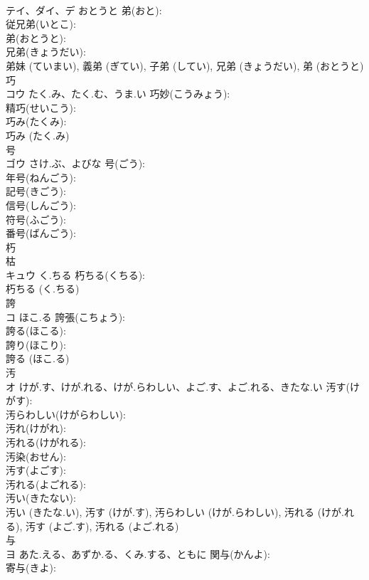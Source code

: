 \documentclass[8pt]{extreport}
\begin{document}
\begin{CJK}{UTF8}{min}
\\	テイ、ダイ、デ	おとうと	弟(おと): 
\\	従兄弟(いとこ): 
\\	弟(おとうと): 
\\	兄弟(きょうだい): 
\\	弟妹 (ていまい), 義弟 (ぎてい), 子弟 (してい), 兄弟 (きょうだい), 弟 (おとうと)
\\	巧			
\\	コウ	たく.み、たく.む、うま.い	巧妙(こうみょう): 
\\	精巧(せいこう): 
\\	巧み(たくみ): 
\\	巧み (たく.み)
\\	号			
\\	ゴウ	さけ.ぶ、よびな	号(ごう): 
\\	年号(ねんごう): 
\\	記号(きごう): 
\\	信号(しんごう): 
\\	符号(ふごう): 
\\	番号(ばんごう): 
\\	朽			
\\	枯 
\\	キュウ	く.ちる	朽ちる(くちる): 
\\	朽ちる (く.ちる)
\\	誇			
\\	コ	ほこ.る	誇張(こちょう): 
\\	誇る(ほこる): 
\\	誇り(ほこり): 
\\	誇る (ほこ.る)
\\	汚			
\\	オ	けが.す、けが.れる、けが.らわしい、よご.す、よご.れる、きたな.い	汚す(けがす): 
\\	汚らわしい(けがらわしい): 
\\	汚れ(けがれ): 
\\	汚れる(けがれる): 
\\	汚染(おせん): 
\\	汚す(よごす): 
\\	汚れる(よごれる): 
\\	汚い(きたない): 
\\	汚い (きたな.い), 汚す (けが.す), 汚らわしい (けが.らわしい), 汚れる (けが.れる), 汚す (よご.す), 汚れる (よご.れる)
\\	与			
\\	ヨ	あた.える、あずか.る、くみ.する、ともに	関与(かんよ): 
\\	寄与(きよ): 

\end{CJK}
\end{document}
